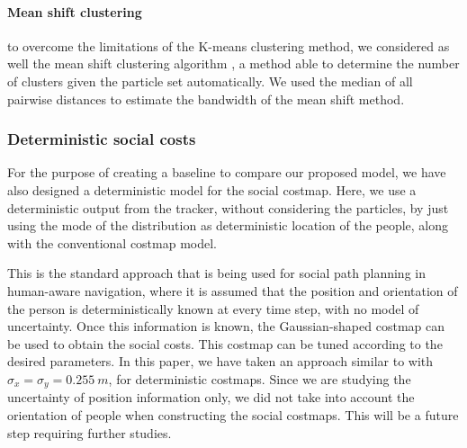 \paragraph{Mean shift clustering}
to overcome the limitations of the K-means clustering method, we considered as well the mean shift clustering algorithm \cite{comaniciu2002mean}, a method able to determine the number of clusters given the particle set automatically. We used the median of all pairwise distances to estimate the bandwidth of the mean shift method.


\subsubsection{Deterministic social costs}
For the purpose of creating a baseline to compare our proposed model, we have also designed a deterministic model for the social costmap. 
Here, we use a deterministic output from the tracker, without considering the particles, by just using the mode of the distribution as deterministic location of the people, along with the conventional costmap model. 


This is the standard approach that is being used for social path planning in human-aware navigation, where it is assumed that the position and orientation of the person is deterministically known at every time step, with no model of uncertainty. Once this information is known, the Gaussian-shaped costmap can be used to obtain the social costs. This costmap can be tuned according to the desired parameters. In this paper, we have taken an approach similar to \cite{gomez2013social} with ${\sigma}_{x} = {\sigma}_{y} = 0.255\ m$, for deterministic costmaps. Since we are studying the uncertainty of position information only, we did not take into account the orientation of people when constructing the social costmaps. This will be a future step requiring further studies.


 




